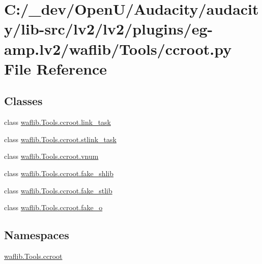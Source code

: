 \hypertarget{lv2_2plugins_2eg-amp_8lv2_2waflib_2_tools_2ccroot_8py}{}\section{C\+:/\+\_\+dev/\+Open\+U/\+Audacity/audacity/lib-\/src/lv2/lv2/plugins/eg-\/amp.lv2/waflib/\+Tools/ccroot.py File Reference}
\label{lv2_2plugins_2eg-amp_8lv2_2waflib_2_tools_2ccroot_8py}
\subsection*{Classes}
\begin{DoxyCompactItemize}
\item 
class \hyperlink{classwaflib_1_1_tools_1_1ccroot_1_1link__task}{waflib.\+Tools.\+ccroot.\+link\+\_\+task}
\item 
class \hyperlink{classwaflib_1_1_tools_1_1ccroot_1_1stlink__task}{waflib.\+Tools.\+ccroot.\+stlink\+\_\+task}
\item 
class \hyperlink{classwaflib_1_1_tools_1_1ccroot_1_1vnum}{waflib.\+Tools.\+ccroot.\+vnum}
\item 
class \hyperlink{classwaflib_1_1_tools_1_1ccroot_1_1fake__shlib}{waflib.\+Tools.\+ccroot.\+fake\+\_\+shlib}
\item 
class \hyperlink{classwaflib_1_1_tools_1_1ccroot_1_1fake__stlib}{waflib.\+Tools.\+ccroot.\+fake\+\_\+stlib}
\item 
class \hyperlink{classwaflib_1_1_tools_1_1ccroot_1_1fake__o}{waflib.\+Tools.\+ccroot.\+fake\+\_\+o}
\end{DoxyCompactItemize}
\subsection*{Namespaces}
\begin{DoxyCompactItemize}
\item 
 \hyperlink{namespacewaflib_1_1_tools_1_1ccroot}{waflib.\+Tools.\+ccroot}
\end{DoxyCompactItemize}
